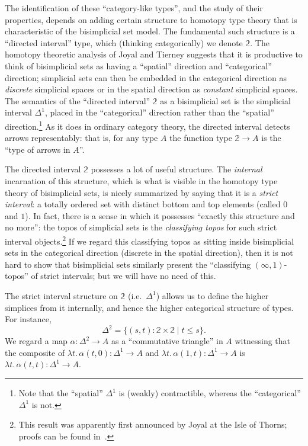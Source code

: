 \documentclass{amsart}
\theoremstyle{plain}
\theoremstyle{definition}
\theoremstyle{remark}
\numberwithin{equation}{section}
\newcommand{\lam}[1]{\lambda #1.\,}
\newcommand{\two}{\mathbb{2}}
\begin{document}
The identification of these ``category-like types'', and the study of their properties, depends on adding certain structure to homotopy type theory that is characteristic of the bisimplicial set model.
The fundamental such structure is a ``directed interval'' type, which (thinking categorically) we denote $\two$.
The homotopy theoretic analysis of Joyal and Tierney \cite{JT} suggests that it is productive to think of bisimplicial sets as having a  ``spatial'' direction and ``categorical'' direction; simplicial sets can then be embedded in the categorical direction as \emph{discrete} simplicial spaces or in the spatial direction as \emph{constant} simplicial spaces. The semantics of the ``directed interval'' $\two$ as a bisimplicial set is the simplicial interval $\Delta^1$, placed in the ``categorical'' direction rather than the ``spatial'' direction.\footnote{Note that the ``spatial'' $\Delta^1$ is (weakly) contractible, whereas the ``categorical'' $\Delta^1$ is not.}
As it does in ordinary category theory, the directed interval detects arrows representably: that is, for any type $A$ the function type $\two\to A$ is the ``type of arrows in $A$''.

The directed interval $\two$ possesses a lot of useful structure.
The \emph{internal} incarnation of this structure, which is what is visible in the homotopy type theory of bisimplicial sets, is nicely summarized by saying that it is a \emph{strict interval}: a totally ordered set with distinct bottom and top elements (called $0$ and $1$).
In fact, there is a sense in which it possesses ``exactly this structure and no more'': the topos of simplicial sets is the \emph{classifying topos} for such strict interval objects.\footnote{This result was apparently first announced by Joyal at the Isle of Thorns; proofs can be found in~\cite{top-topos,maclane-moerdijk}.}
If we regard this classifying topos as sitting inside bisimplicial sets in the categorical direction (discrete in the spatial direction), then it is not hard to show that bisimplicial sets similarly present the ``classifying $(\infty,1)$-topos'' of strict intervals; but we will have no need of this.

The strict interval structure on $\two$ (i.e.\ $\Delta^1$) allows us to define the higher simplices from it internally, and hence the higher categorical structure of types.
For instance, \[\Delta^2 = \{ (s,t) : \two\times \two \mid t\le s \}.\] We regard a map $\alpha:\Delta^2\to A$ as a ``commutative triangle'' in $A$ witnessing that the composite of $\lam{t}\alpha(t,0):\Delta^1\to A$ and $\lam{t}\alpha(1,t):\Delta^1\to A$ is $\lam{t}\alpha(t,t):\Delta^1 \to A$.
\end{document}
